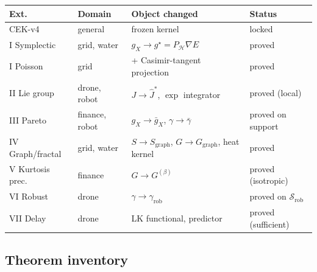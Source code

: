 \documentclass[11pt,a4paper]{article}
\theoremstyle{definition}
\newcommand{\gX}{g_X}
\newcommand{\rob}{\mathrm{rob}}
\newcommand{\graph}{\mathrm{graph}}
\begin{document}
\begin{center}
\renewcommand{\arraystretch}{1.25}
\begin{tabularx}{\textwidth}{l l X l}
\toprule
\textbf{Ext.} & \textbf{Domain} & \textbf{Object changed} & \textbf{Status} \\
\midrule
CEK-v4 & general & frozen kernel & locked \\
I Symplectic & grid, water & $\gX \to g^\star = P_\mathcal{H} \nabla E$ & proved \\
I Poisson & grid & + Casimir-tangent projection & proved \\
II Lie group & drone, robot & $J \to \hat J^\ast$, $\exp$ integrator & proved (local) \\
III Pareto & finance, robot & $g_X \to \bar g_X$, $\gamma \to \bar \gamma$ & proved on support \\
IV Graph/fractal & grid, water & $S \to S_\graph$, $G \to G_\graph$, heat kernel & proved \\
V Kurtosis prec. & finance & $G \to G^{(\beta)}$ & proved (isotropic) \\
VI Robust & drone & $\gamma \to \gamma_\rob$ & proved on $\mathcal{S}_\rob$ \\
VII Delay & drone & LK functional, predictor & proved (sufficient) \\
\bottomrule
\end{tabularx}
\end{center}

\subsection{Theorem inventory}
\end{document}
